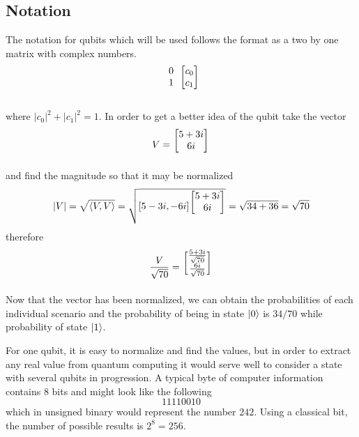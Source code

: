 \documentclass[12pt]{article}
\begin{document}
\subsection{Notation}
The notation for qubits which will be used follows the format as a two by one matrix with complex numbers.
$$ 
\begin{blockarray}{cc}
\begin{block}{c[c]}
0 & c_0 \\
1 & c_1 \\
\end{block}
\end{blockarray}
$$

where $\left| c_0\right |^2 + \left| c_1\right |^2 = 1$. In order to get a better idea of the qubit take the vector
$$ V = 
\begin{blockarray}{c}
\begin{block}{[c]}
5 + 3i \\
6i \\
\end{block}
\end{blockarray}
$$
and find the magnitude so that it may be normalized
$$ \left| V \right| = \sqrt{\langle V, V \rangle} = \sqrt{
  [5-3i, -6i]
\begin{blockarray}{c}
\begin{block}{[c]}
5 + 3i \\
6i \\
\end{block}
\end{blockarray}
} = \sqrt{34+36} = \sqrt{70}
$$
therefore
$$ \frac{V}{\sqrt{70}} = 
\begin{blockarray}{c}
\begin{block}{[c]}
\frac{5 + 3i}{\sqrt{70}} \\
\frac{6i}{\sqrt{70}} \\
\end{block}
\end{blockarray}
$$
Now that the vector has been normalized, we can obtain the probabilities of each individual scenario and the probability of being in state $\ket{0}$ is $34/70$ while probability of state $\ket{1}$.\par
For one qubit, it is easy to normalize and find the values, but in order to extract any real value from quantum computing it would serve well to consider a state with several qubits in progression. A typical byte of computer information contains 8 bits and might look like the following $$ 11110010 $$ which in unsigned binary would represent the number $242$. Using a classical bit, the number of possible results is $2^8 = 256$.\par
\end{document}
